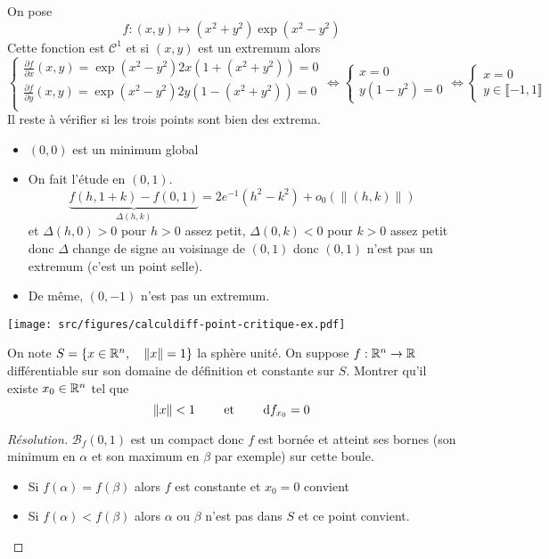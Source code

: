 \begin{ex}
    On pose \[
        f:(x, y)\longmapsto (x^2+y^2)\exp(x^2-y^2)
    \]
    Cette fonction est $\mathcal C^1$ et si $(x, y)$ est un extremum alors \[
        \begin{cases}
            \displaystyle \frac{\partial f}{\partial x}(x, y)=\exp(x^2-y^2)2x(1+(x^2+y^2)) =0 \\[1em]
            \displaystyle \frac{\partial f}{\partial y}(x, y)=\exp(x^2-y^2)2y(1-(x^2+y^2)) =0 \\
            \end{cases} \iff \begin{cases}
            x=0 \\ y(1-y^2)=0
            \end{cases} \iff \begin{cases}
            x=0\\
            y\in \llbracket -1, 1\rrbracket
        \end{cases}
    \]
    Il reste à vérifier si les trois points sont bien des extrema. \begin{itemize}
        \item $(0, 0)$ est un minimum global
        \item On fait l'étude en $(0, 1)$. \[
                \underbrace{f(h, 1+k)-f(0, 1)}_{\Delta(h, k)}=2e^{-1}(h^2-k^2)+o_0(\|(h, k)\|)
            \]
            et $\Delta(h, 0)>0$ pour $h>0$ assez petit, $\Delta(0, k)<0$ pour $k>0$ assez petit donc $\Delta$ change de signe au voisinage de $(0, 1)$ donc $(0, 1)$ n'est pas un extremum (c'est un point selle).
        \item De même, $(0, -1)$ n'est pas un extremum.
    \end{itemize}

    \begin{center}
        \texttt{[image: src/figures/calculdiff-point-critique-ex.pdf]}
    \end{center}

\end{ex}

\begin{exo}
    On note $S=\{x\in\mathbb R^n, \quad \|x\|=1\}$ la sphère unité. On suppose $f:\mathbb R^n\to \mathbb R$ différentiable sur son domaine de définition et constante sur $S$. Montrer qu'il existe $x_0\in\mathbb R^n$ tel que \[
        \|x\|<1 \qquad\text{ et }\qquad \mathrm{d} f_{x_0}=0
    \]
\end{exo}

\begin{proof}[Résolution]
    $\mathcal B_f(0, 1)$ est un compact donc $f$ est bornée et atteint ses bornes (son minimum en $\alpha$ et son maximum en $\beta$ par exemple) sur cette boule.
    \begin{itemize}
        \item Si $f(\alpha)=f(\beta)$ alors $f$ est constante et $x_0=0$ convient
        \item Si $f(\alpha)<f(\beta)$ alors $\alpha$ ou $\beta$ n'est pas dans $S$ et ce point convient.
    \end{itemize}
\end{proof}


